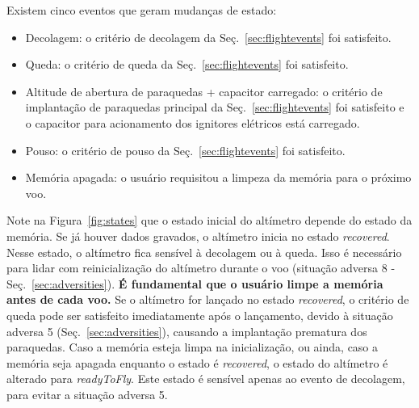\documentclass[12pt,a4paper]{article}
\begin{document}
Existem cinco eventos que geram mudanças de estado:
\begin{itemize}
	\item Decolagem: o critério de decolagem da Seç.~\ref{sec:flightevents} foi satisfeito.
	\item Queda: o critério de queda da Seç.~\ref{sec:flightevents} foi satisfeito.
	\item Altitude de abertura de paraquedas + capacitor carregado: o critério de implantação de paraquedas principal da Seç.~\ref{sec:flightevents} foi satisfeito e o capacitor para acionamento dos ignitores elétricos está carregado.
	\item Pouso: o critério de pouso da Seç.~\ref{sec:flightevents} foi satisfeito.
	\item Memória apagada: o usuário requisitou a limpeza da memória para o próximo voo.
\end{itemize}

Note na Figura~\ref{fig:states} que o estado inicial do altímetro depende do estado da memória. Se já houver dados gravados, o altímetro inicia no estado \textit{recovered}. Nesse estado, o altímetro fica sensível à decolagem ou à queda. Isso é necessário para lidar com reinicialização do altímetro durante o voo (situação adversa 8 - Seç.~\ref{sec:adversities}). \textbf{É fundamental que o usuário limpe a memória antes de cada voo.} Se o altímetro for lançado no estado \textit{recovered}, o critério de queda pode ser satisfeito imediatamente após o lançamento, devido à situação adversa 5 (Seç.~\ref{sec:adversities}), causando a implantação prematura dos paraquedas. Caso a memória esteja limpa na inicialização, ou ainda, caso a memória seja apagada enquanto o estado é \textit{recovered}, o estado do altímetro é alterado para \textit{readyToFly}. Este estado é sensível apenas ao evento de decolagem, para evitar a situação adversa 5.
\end{document}
